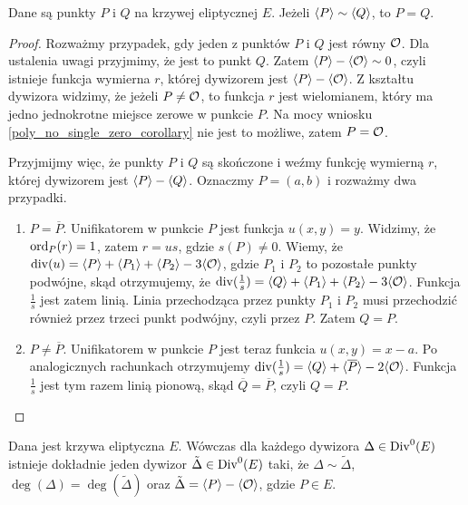 \begin{lemma}\label{sim_pq_eq_pq_lemma}
Dane są punkty $P$ i $Q$ na krzywej eliptycznej $E$.
Jeżeli $\langle P\rangle \sim \langle Q\rangle$,
to $P = Q$.
\end{lemma}

\begin{proof}
Rozważmy przypadek, gdy jeden z punktów $P$ i $Q$ jest równy $\mathcal{O}$.
Dla ustalenia uwagi przyjmimy, że jest to punkt $Q$.
Zatem $\langle P\rangle - \langle\mathcal{O}\rangle \sim 0$,
czyli istnieje funkcja wymierna $r$,
której dywizorem jest $\langle P\rangle - \langle\mathcal{O}\rangle$.
Z kształtu dywizora widzimy, że jeżeli $P \neq \mathcal{O}$, to funkcja $r$
jest wielomianem, który ma jedno jednokrotne miejsce zerowe w punkcie $P$.
Na mocy wniosku \ref{poly_no_single_zero_corollary} nie jest to możliwe,
zatem $P = \mathcal{O}$.

Przyjmijmy więc, że punkty $P$ i $Q$ są skończone
i weźmy funkcję wymierną $r$, której dywizorem jest $\langle P\rangle - \langle Q\rangle$.
Oznaczmy $P = (a, b)$ i rozważmy dwa przypadki.
\begin{enumerate}
\item $P = \overline{P}$.
Unifikatorem w punkcie $P$ jest funkcja $u(x, y) = y$.
Widzimy, że $\operatorname{ord}_P(r) = 1$, zatem $r = us$, gdzie $s(P) \neq 0$.
Wiemy, że $\operatorname{div}(u) = \langle P\rangle + \langle P_1\rangle + \langle P_2\rangle - 3\langle\mathcal{O}\rangle$,
gdzie $P_1$ i $P_2$ to pozostałe punkty podwójne,
skąd otrzymujemy, że
$\operatorname{div}(\frac{1}{s}) = \langle Q\rangle + \langle P_1\rangle + \langle P_2\rangle - 3\langle\mathcal{O}\rangle$.
Funkcja $\frac{1}{s}$ jest zatem linią.
Linia przechodząca przez punkty $P_1$ i $P_2$ musi przechodzić również przez
trzeci punkt podwójny, czyli przez $P$. Zatem $Q = P$.
\item $P \neq \overline{P}$.
Unifikatorem w punkcie $P$ jest teraz funkcia $u(x, y) = x - a$.
Po analogicznych rachunkach otrzymujemy
$\operatorname{div}(\frac{1}{s}) = \langle Q\rangle + \langle\overline{P}\rangle - 2\langle\mathcal{O}\rangle$.
Funkcja $\frac{1}{s}$ jest tym razem linią pionową,
skąd $\overline{Q} = \overline{P}$, czyli $Q = P$.
\end{enumerate}
\end{proof}

\begin{theorem}\label{zerodeg_divisor_linear_reduction_theorem}
Dana jest krzywa eliptyczna $E$.
Wówczas dla każdego dywizora $\Delta \in \operatorname{Div}^0(E)$
istnieje dokładnie jeden dywizor $\tilde{\Delta} \in \operatorname{Div}^0(E)$ taki,
że $\Delta \sim \tilde{\Delta}$, $\deg(\Delta) = \deg(\tilde{\Delta})$
oraz $\tilde{\Delta} = \langle P\rangle - \langle\mathcal{O}\rangle$,
gdzie $P \in E$.
\end{theorem}

